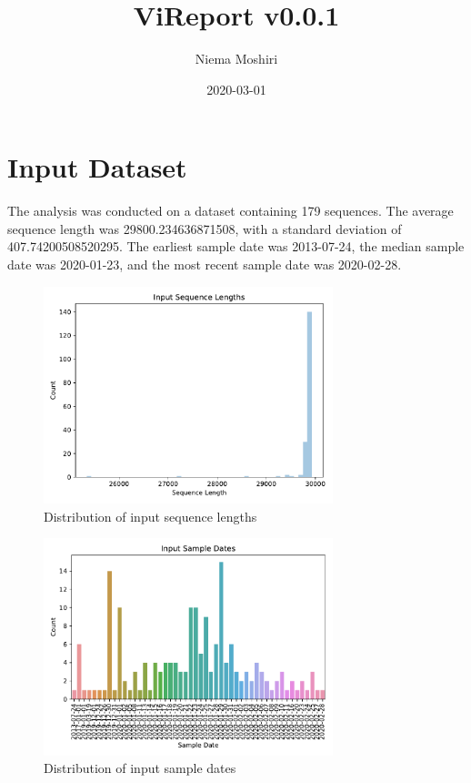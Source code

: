 \documentclass{article}
\title{\vspace{-2.0cm}ViReport v0.0.1}
\author{Niema Moshiri}
\date{2020-03-01}
\begin{document}
\maketitle

\section{Input Dataset}
The analysis was conducted on a dataset containing 179 sequences.
The average sequence length was 29800.234636871508,
with a standard deviation of 407.74200508520295.
The earliest sample date was 2013-07-24,
the median sample date was 2020-01-23,
and the most recent sample date was 2020-02-28.


\begin{figure}[h]
\centering
\includegraphics[width=0.75\textwidth]{./figs/input_sequence_lengths.pdf}
\caption{Distribution of input sequence lengths}
\end{figure}



\begin{figure}[h]
\centering
\includegraphics[width=0.75\textwidth]{./figs/input_sample_dates.pdf}
\caption{Distribution of input sample dates}
\end{figure}
\end{document}

